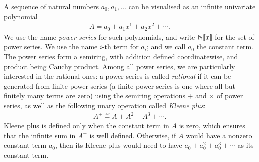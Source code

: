 A sequence of natural numbers $a_0,a_1,\ldots$ can be visualised as an infinite univariate polynomial
\begin{align*}
 A = a_0 + a_1x^1 + a_2x^2 + \cdots.
\end{align*}
We use the name \emph{power series} for such polynomials, and write $\mathbb N [\![x]\!]$ for the set of power series. 
We use the name $i$-th term for $a_i$; and we call $a_0$ the constant term. The power series form a semiring, with addition defined coordinatewise, and product being Cauchy product. Among all power series, we are particularly interested in the rational ones: a power series is called \emph{rational} if it can be generated from finite power series (a finite power series is one where all but finitely many terms are zero) using the semiring operations $+$ and $\times$ of power series, as well as the following unary  operation called \emph{Kleene plus}:
\begin{align*}
 A^+ \eqdef A + A^2 + A^3 + \cdots.
\end{align*}   
Kleene plus   is defined only when the constant term   in $A$ is zero, which ensures that the infinite sum in $A^+$ is well defined. Otherwise, if $A$ would have a nonzero constant term $a_0$, then its Kleene plus would need to have $a_0 + a_0^2 + a_0^3 + \cdots$ as its constant term.

